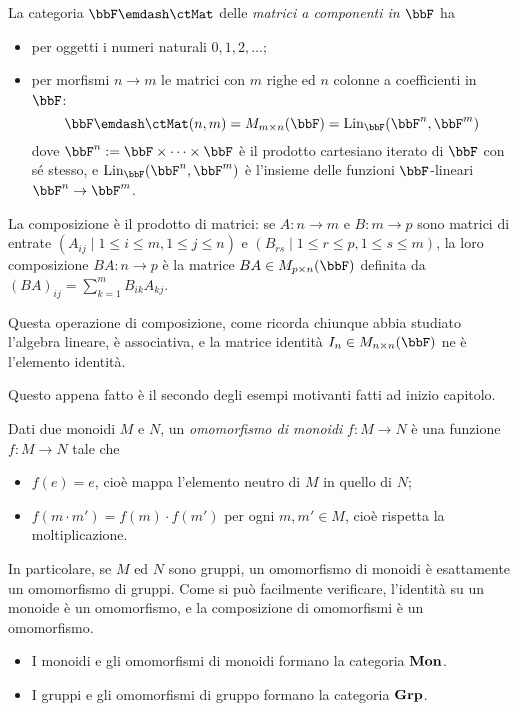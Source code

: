 \begin{example}\label{ex_cat_matrici}
	La categoria \(\bbF\emdash\ctMat\) delle \emph{matrici a componenti in \(\bbF\)} ha
	\begin{itemize}
		\item per oggetti i numeri naturali \(0,1,2,\dots\);
		\item per morfismi \(n\to m\) le matrici con \(m\) righe ed \(n\) colonne a coefficienti in \(\bbF\):
		      \[\bbF\emdash\ctMat(n,m) = M_{m\times n}(\bbF) = \text{Lin}_{\bbF}(\bbF^n,\bbF^m)\]
		      dove \(\bbF^n:=\bbF \times\dots\times\bbF\) è il prodotto cartesiano iterato di \(\bbF\) con sé stesso, e \(\text{Lin}_{\bbF}(\bbF^n,\bbF^m)\) è l'insieme delle funzioni \(\bbF\)-lineari \(\bbF^n\to\bbF^m\).
	\end{itemize}
	La composizione è il prodotto di matrici: se \(A : n\to m\) e \(B : m\to p\) sono matrici di entrate \((A_{ij}\mid 1\le i\le m,1\le j\le n)\) e \((B_{rs}\mid 1\le r\le p,1\le s\le m)\), la loro composizione \(BA : n\to p\) è la matrice \(BA\in M_{p\times n}(\bbF)\) definita da \((BA)_{ij} = \sum_{k=1}^m B_{ik}A_{kj}\).

	Questa operazione di composizione, come ricorda chiunque abbia studiato l'algebra lineare, è associativa, e la matrice identità \(I_n\in M_{n\times n}(\bbF)\) ne è l'elemento identità.
\end{example}
Questo appena fatto è il secondo degli esempi motivanti fatti ad inizio capitolo.
\begin{example}\label{ex_cat_monoidi}
	Dati due monoidi \(M\) e \(N\), un \emph{omomorfismo di monoidi} \(f:M\to N\) è una funzione \(f:M\to N\) tale che
	\begin{itemize}
		\item \(f(e) = e\), cioè mappa l'elemento neutro di \(M\) in quello di \(N\);
		\item \(f(m\cdot m')=f(m)\cdot f(m')\) per ogni \(m,m'\in M\), cioè rispetta la moltiplicazione.
	\end{itemize}
	In particolare, se \(M\) ed \(N\) sono gruppi, un omomorfismo di monoidi è esattamente un omomorfismo di gruppi.
	Come si può facilmente verificare, l'identità su un monoide è un omomorfismo, e la composizione di omomorfismi è un omomorfismo.
	\begin{itemize}
		\item I monoidi e gli omomorfismi di monoidi formano la categoria \(\mathbf{Mon}\).
		\item I gruppi e gli omomorfismi di gruppo formano la categoria \(\mathbf{Grp}\).
	\end{itemize}
\end{example}
